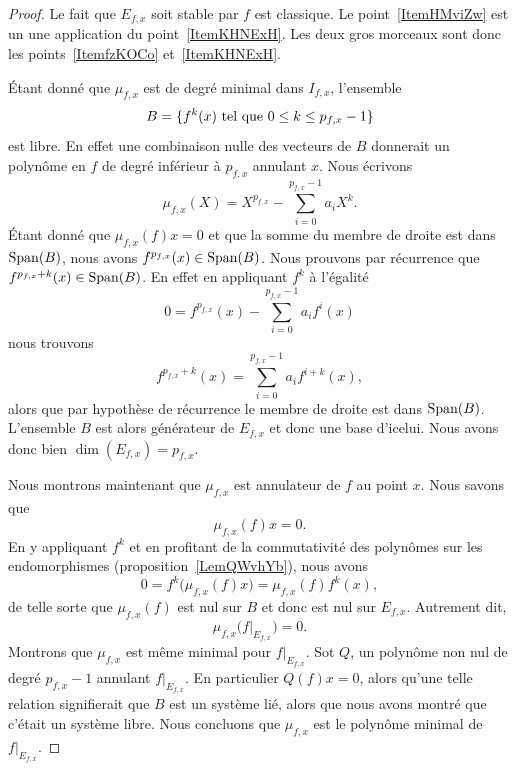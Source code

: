 \begin{proof}
    Le fait que \( E_{f,x}\) soit stable par \( f\) est classique. Le point~\ref{ItemHMviZw} est un une application du point~\ref{ItemKHNExH}. Les deux gros morceaux sont donc les points~\ref{ItemfzKOCo} et~\ref{ItemKHNExH}.

    Étant donné que \( \mu_{f,x}\) est de degré minimal dans \( I_{f,x}\), l'ensemble
    \begin{equation}
        B=\{ f^k(x)\text{ tel que } 0\leq k\leq p_{f,x}-1 \}
    \end{equation}
    est libre. En effet une combinaison nulle des vecteurs de \( B\) donnerait un polynôme en \( f\) de degré inférieur à \( p_{f,x}\) annulant \( x\). Nous écrivons
    \begin{equation}
        \mu_{f,x}(X)=X^{p_{f,x}}-\sum_{i=0}^{p_{f,x}-1}a_iX^k.
    \end{equation}
    Étant donné que \( \mu_{f,x}(f)x=0\) et que la somme du membre de droite est dans \( \operatorname{Span}(B)\), nous avons \( f^{p_{f,x}}(x)\in\operatorname{Span}(B)\). Nous prouvons par récurrence que \( f^{p_{f,x}+k}(x)\in\operatorname{Span}(B)\). En effet en appliquant \( f^k\) à l'égalité
    \begin{equation}
        0=f^{p_{f,x}}(x)-\sum_{i=0}^{p_{f,x}-1}a_if^i(x)
    \end{equation}
    nous trouvons
    \begin{equation}
        f^{p_{f,x}+k}(x)=\sum_{i=0}^{p_{f,x}-1}a_if^{i+k}(x),
    \end{equation}
    alors que par hypothèse de récurrence le membre de droite est dans \( \operatorname{Span}(B)\). L'ensemble \( B\) est alors générateur de \( E_{f,x}\) et donc une base d'icelui. Nous avons donc bien \( \dim(E_{f,x})=p_{f,x}\).

    Nous montrons maintenant que \( \mu_{f,x}\) est annulateur de \( f\) au point \( x\). Nous savons que
    \begin{equation}
        \mu_{f,x}(f)x=0.
    \end{equation}
    En y appliquant \( f^k\) et en profitant de la commutativité des polynômes sur les endomorphismes (proposition~\ref{LemQWvhYb}), nous avons
    \begin{equation}
        0=f^k\big( \mu_{f,x}(f)x \big)=\mu_{f,x}(f)f^k(x),
    \end{equation}
    de telle sorte que \( \mu_{f,x}(f)\) est nul sur \( B\) et donc est nul sur \( E_{f,x}\). Autrement dit,
    \begin{equation}
        \mu_{f,x}\big( f|_{E_{f,x}} \big)=0.
    \end{equation}
    Montrons que \( \mu_{f,x}\) est même minimal pour \( f|_{E_{f,x}}\). Sot \( Q\), un polynôme non nul de degré \( p_{f,x}-1\) annulant \( f|_{E_{f,x}}\). En particulier \( Q(f)x=0\), alors qu'une telle relation signifierait que \( B\) est un système lié, alors que nous avons montré que c'était un système libre. Nous concluons que \( \mu_{f,x}\) est le polynôme minimal de \( f|_{E_{f,x}}\).
\end{proof}

